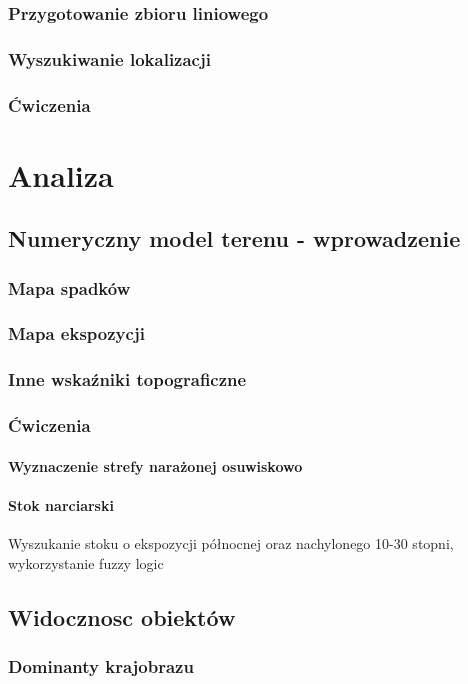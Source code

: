 \documentclass[a4paper,11pt, onecolumn, openany]{memoir}
\begin{document}
		\section{Przygotowanie zbioru liniowego}
		\section{Wyszukiwanie lokalizacji}
		\section{Ćwiczenia}

\part{Analiza}
	\chapter{Numeryczny model terenu - wprowadzenie}
		\section{Mapa spadków}
		\section{Mapa ekspozycji}
		\section{Inne wskaźniki topograficzne}
		\section{Ćwiczenia}
			\subsection{Wyznaczenie strefy narażonej osuwiskowo}
			\subsection{Stok narciarski}
	Wyszukanie stoku o ekspozycji północnej oraz nachylonego 10-30 stopni, wykorzystanie fuzzy logic
	\chapter{Widocznosc obiektów}
\section{Dominanty krajobrazu}
\end{document}
